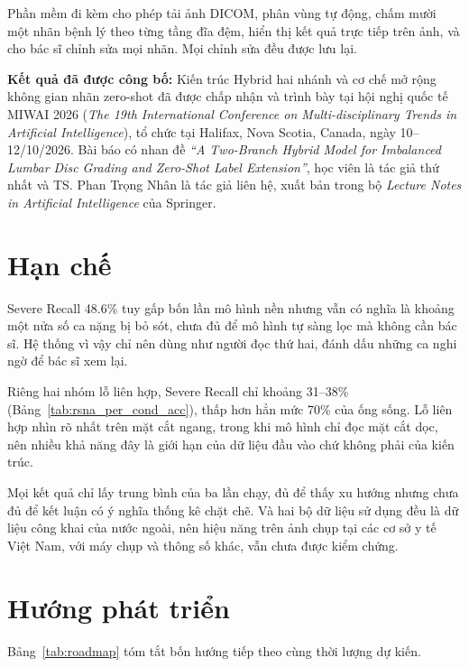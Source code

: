 Phần mềm đi kèm cho phép tải ảnh DICOM, phân vùng tự động, chấm mười một nhãn bệnh lý theo từng tầng đĩa đệm, hiển thị kết quả trực tiếp trên ảnh, và cho bác sĩ chỉnh sửa mọi nhãn. Mọi chỉnh sửa đều được lưu lại.

\textbf{Kết quả đã được công bố:} Kiến trúc Hybrid hai nhánh và cơ chế mở rộng không gian nhãn zero-shot đã được chấp nhận và trình bày tại hội nghị quốc tế MIWAI 2026 (\textit{The 19th International Conference on Multi-disciplinary Trends in Artificial Intelligence}), tổ chức tại Halifax, Nova Scotia, Canada, ngày 10--12/10/2026. Bài báo có nhan đề \textit{``A Two-Branch Hybrid Model for Imbalanced Lumbar Disc Grading and Zero-Shot Label Extension''}, học viên là tác giả thứ nhất và TS. Phan Trọng Nhân là tác giả liên hệ, xuất bản trong bộ \textit{Lecture Notes in Artificial Intelligence} của Springer.

\section{Hạn chế}

Severe Recall 48.6\% tuy gấp bốn lần mô hình nền nhưng vẫn có nghĩa là khoảng một nửa số ca nặng bị bỏ sót, chưa đủ để mô hình tự sàng lọc mà không cần bác sĩ. Hệ thống vì vậy chỉ nên dùng như người đọc thứ hai, đánh dấu những ca nghi ngờ để bác sĩ xem lại.

Riêng hai nhóm lỗ liên hợp, Severe Recall chỉ khoảng 31--38\% (Bảng~\ref{tab:rsna_per_cond_acc}), thấp hơn hẳn mức 70\% của ống sống. Lỗ liên hợp nhìn rõ nhất trên mặt cắt ngang, trong khi mô hình chỉ đọc mặt cắt dọc, nên nhiều khả năng đây là giới hạn của dữ liệu đầu vào chứ không phải của kiến trúc.

Mọi kết quả chỉ lấy trung bình của ba lần chạy, đủ để thấy xu hướng nhưng chưa đủ để kết luận có ý nghĩa thống kê chặt chẽ. Và hai bộ dữ liệu sử dụng đều là dữ liệu công khai của nước ngoài, nên hiệu năng trên ảnh chụp tại các cơ sở y tế Việt Nam, với máy chụp và thông số khác, vẫn chưa được kiểm chứng.

\section{Hướng phát triển}

Bảng~\ref{tab:roadmap} tóm tắt bốn hướng tiếp theo cùng thời lượng dự kiến.

